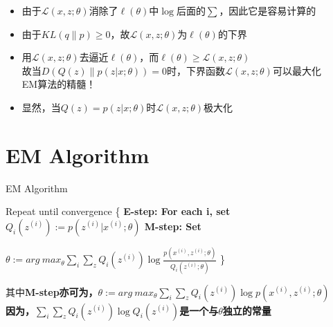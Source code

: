 \documentclass[noindent]{beamer}
\begin{document}
\begin{frame}
\begin{itemize}
\item {
由于$\mathcal{L}(x,z;\theta)$消除了$\ell(\theta)$中$\log$后面的$\sum$，因此它是容易计算的
}
\item{
由于$KL(q \parallel p) \geq 0$，故$\mathcal{L}(x,z;\theta)$为$\ell(\theta)$的下界
}
\item {
用$\mathcal{L}(x,z;\theta)$去逼近$\ell(\theta)$，而$\ell(\theta) \geq \mathcal{L}(x,z;\theta)$\\
故当$D(Q(z) \parallel p(z|x;\theta)) = 0$时，下界函数$\mathcal{L}(x,z;\theta)$可以最大化\\
\pause
EM算法的精髓！
}
\item {
显然，当$Q(z) = p(z|x;\theta)$时$\mathcal{L}(x,z;\theta)$极大化
}
\end{itemize}
\end{frame}

\section{EM Algorithm}
\begin{frame} {EM Algorithm}
\begin{codebox}
    \li Repeat until convergence \{
        \Do
    \li      \bf{E-step}: 
    \li			For each i, set
             \Do 
    \li                   $Q_{i}(z^{(i)}) := p(z^{(i)}|x^{(i)};\theta)$
             \End
    \li      \bf{M-step}:
    \li			 Set
             \Do

    \li			 $\theta := arg\ max_{\theta}  \sum_{i} \sum_{z}Q_{i}(z^{(i)}) \log \frac{p(x^{(i)},z^{(i)};\theta)}{Q_{i}(z^{(i)};\theta)}$
             \End
        \End
    \li \}
\end{codebox}
其中\bf{M-step}亦可为，$\theta := arg\ max_{\theta}  \sum_{i} \sum_{z}Q_{i}(z^{(i)}) \log p(x^{(i)},z^{(i)};\theta)$\\
因为，$\sum_{i} \sum_{z}Q_{i}(z^{(i)}) \log Q_i(z^{(i)})$是一个与$\theta$独立的常量
\end{frame}
\end{document}
